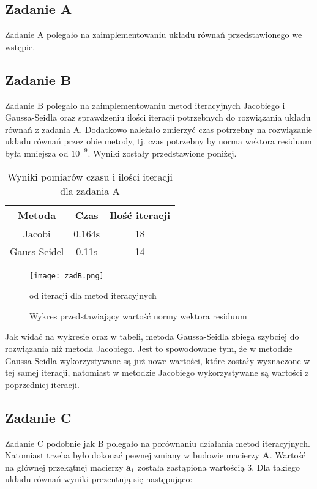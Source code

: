 \documentclass{article}
\begin{document}
\subsection{Zadanie A}
Zadanie A polegało na zaimplementowaniu układu równań przedstawionego we
wstępie.
\subsection{Zadanie B}
Zadanie B polegało na zaimplementowaniu metod iteracyjnych Jacobiego i 
Gaussa-Seidla oraz sprawdzeniu ilości iteracji potrzebnych do rozwiązania
układu równań z zadania A. Dodatkowo należało zmierzyć czas potrzebny na
rozwiązanie układu równań przez obie metody, tj. czas potrzebny by norma
wektora residuum była mniejsza od $10^{-9}$.
Wyniki zostały przedstawione poniżej.

\begin{table}[H]
    \begin{center}
        \begin{tabular}{| c | c | c |} 
        \hline
        Metoda & Czas & Ilość iteracji \\
        \hline
        Jacobi & 0.164s & 18 \\
        \hline
        Gauss-Seidel & 0.11s & 14 \\
        \hline
        \end{tabular}
        \caption{Wyniki pomiarów czasu i ilości iteracji dla zadania A}
    \end{center}
\end{table}

\begin{figure}[H]
    \texttt{[image: zadB.png]}
    \centering
    \caption{Wykres przedstawiający wartość normy wektora residuum}
    {od iteracji dla metod iteracyjnych}
\end{figure}

Jak widać na wykresie oraz w tabeli, metoda Gaussa-Seidla zbiega szybciej do
rozwiązania niż metoda Jacobiego. Jest to spowodowane tym, że w metodzie
Gaussa-Seidla wykorzystywane są już nowe wartości, które zostały wyznaczone
w tej samej iteracji, natomiast w metodzie Jacobiego wykorzystywane są
wartości z poprzedniej iteracji.

\subsection{Zadanie C}
Zadanie C podobnie jak B polegało na porównaniu działania metod iteracyjnych.
Natomiast trzeba było dokonać pewnej zmiany w budowie macierzy $\boldsymbol{A}$.
Wartość na głównej przekątnej macierzy $\boldsymbol{a_1}$ została zastąpiona
wartością 3. Dla takiego układu równań wyniki prezentują się następująco:
\end{document}
